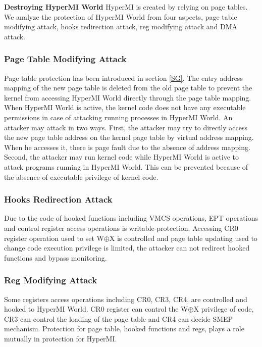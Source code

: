 \documentclass[conference]{IEEEtran}
\begin{document}
\textbf{Destroying HyperMI World}
HyperMI is created by relying on page tables.
We analyze the protection of HyperMI World from four aspects, page table modifying attack, hooks redirection attack, reg modifying attack and DMA attack.


\subsubsection{Page Table Modifying Attack}

Page table protection has been introduced in section \ref{SG}. The entry address mapping of the new page table is deleted from the old page table to prevent the kernel from accessing HyperMI World directly through the page table mapping. When HyperMI World is active, the kernel code does not have any executable permissions in case of attacking running processes in HyperMI World. An attacker may attack in two ways.
First, the attacker may try to directly access the new page table address on the kernel page table by virtual address mapping. When he accesses it, there is page fault due to the absence of address mapping.
Second, the attacker may run kernel code while HyperMI World is active to attack programs running in HyperMI World. This can be prevented because of the absence of executable privilege of kernel code.



\subsubsection{Hooks Redirection Attack}

Due to the code of hooked functions including VMCS operations, EPT operations and control register access operations is writable-protection. Accessing CR0 register operation used to set W$\oplus${X} is controlled and page table updating used to change code execution privilege is limited, the attacker can not redirect hooked functions and bypass monitoring.

\subsubsection{Reg Modifying Attack}

Some registers access operations including CR0, CR3, CR4, are controlled and hooked to HyperMI World. CR0 register can control the W$\oplus${X} privilege of code, CR3 can control the loading of the page table and CR4 can decide SMEP mechanism. Protection for page table, hooked functions and regs, plays a role mutually in protection for HyperMI. 
\end{document}
